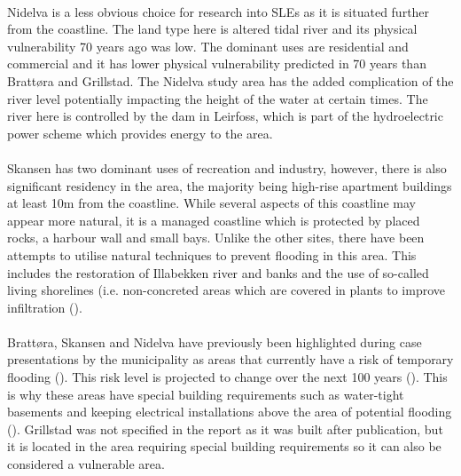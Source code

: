 \paragraph{}
Nidelva is a less obvious choice for research into SLEs as it is situated further from the coastline. The land type here is altered tidal river and its physical vulnerability 70 years ago was low. The dominant uses are residential and commercial and it has lower physical vulnerability predicted in 70 years than Brattøra and Grillstad. The Nidelva study area has the added complication of the river level potentially impacting the height of the water at certain times. The river here is controlled by the dam in Leirfoss, which is part of the hydroelectric power scheme which provides energy to the area.
\paragraph{}
Skansen has two dominant uses of recreation and industry, however, there is also significant residency in the area, the majority being high-rise apartment buildings at least 10m from the coastline. While several aspects of this coastline may appear more natural, it is a managed coastline which is protected by placed rocks, a harbour wall and small bays. Unlike the other sites, there have been attempts to utilise natural techniques to prevent flooding in this area. This includes the restoration of Illabekken river and banks and the use of so-called living shorelines (i.e. non-concreted areas which are covered in plants to improve infiltration (\cite{selliseth_ilabekken_2021}).
\paragraph{}

\paragraph{}
Brattøra, Skansen and Nidelva have previously been highlighted during case presentations by the municipality as areas that currently have a risk of temporary flooding (\cite{hanssen_saksframlegg_2013}). This risk level is projected to change over the next 100 years (\cite{hanssen-bauer_climate_2017}). This is why these areas have special building requirements such as water-tight basements and keeping electrical installations above the area of potential flooding (\cite{hanssen_saksframlegg_2013}). Grillstad was not specified in the report as it was built after publication, but it is located in the area requiring special building requirements so it can also be considered a vulnerable area. 

